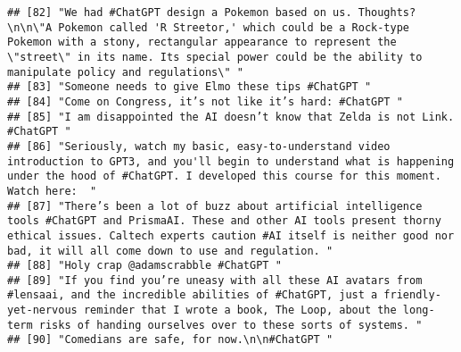 \documentclass[
]{article}
\begin{document}
\begin{verbatim}
## [82] "We had #ChatGPT design a Pokemon based on us. Thoughts?\n\n\"A Pokemon called 'R Streetor,' which could be a Rock-type Pokemon with a stony, rectangular appearance to represent the \"street\" in its name. Its special power could be the ability to manipulate policy and regulations\" "                   
## [83] "Someone needs to give Elmo these tips #ChatGPT "                                                                                                                                                                                                                                                               
## [84] "Come on Congress, it’s not like it’s hard: #ChatGPT "                                                                                                                                                                                                                                                          
## [85] "I am disappointed the AI doesn’t know that Zelda is not Link. #ChatGPT "                                                                                                                                                                                                                                       
## [86] "Seriously, watch my basic, easy-to-understand video introduction to GPT3, and you'll begin to understand what is happening under the hood of #ChatGPT. I developed this course for this moment. Watch here:  "                                                                                                 
## [87] "There’s been a lot of buzz about artificial intelligence tools #ChatGPT and PrismaAI. These and other AI tools present thorny ethical issues. Caltech experts caution #AI itself is neither good nor bad, it will all come down to use and regulation. "                                                       
## [88] "Holy crap @adamscrabble #ChatGPT "                                                                                                                                                                                                                                                                             
## [89] "If you find you’re uneasy with all these AI avatars from #lensaai, and the incredible abilities of #ChatGPT, just a friendly-yet-nervous reminder that I wrote a book, The Loop, about the long-term risks of handing ourselves over to these sorts of systems. "                                              
## [90] "Comedians are safe, for now.\n\n#ChatGPT "                                                                                                                                                                                                                                                                     

\end{verbatim}
\end{document}
